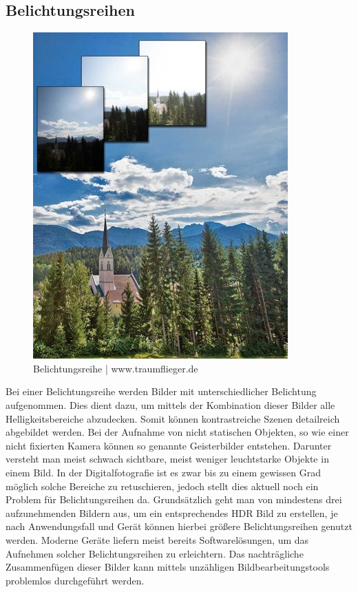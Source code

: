 \documentclass[11pt, a4paper, twocolumn]{article}
\begin{document}
	\subsection{Belichtungsreihen}
		\begin{figure}[H]
		\centering
		\includegraphics[scale=0.6]{img/belichtungsreihen.jpg}
		\caption{Belichtungsreihe | www.traumflieger.de}
	\end{figure}
	Bei einer Belichtungsreihe werden Bilder mit unterschiedlicher Belichtung aufgenommen. Dies dient dazu, um mittels der Kombination dieser Bilder alle Helligkeitsbereiche abzudecken. Somit können kontrastreiche Szenen detailreich abgebildet werden. Bei der Aufnahme von nicht statischen Objekten, so wie einer nicht fixierten Kamera können so genannte Geisterbilder entstehen. Darunter versteht man meist schwach sichtbare, meist weniger leuchtstarke Objekte in einem Bild. In der Digitalfotografie ist es zwar bis zu einem gewissen Grad möglich solche Bereiche zu retuschieren, jedoch stellt dies aktuell noch ein Problem für Belichtungsreihen da. Grundsätzlich geht man von mindestens drei aufzunehmenden Bildern aus, um ein entsprechendes HDR Bild zu erstellen, je nach Anwendungsfall und Gerät können hierbei größere Belichtungsreihen genutzt werden. Moderne Geräte liefern meist bereits Softwarelösungen, um das Aufnehmen solcher Belichtungsreihen zu erleichtern. Das nachträgliche Zusammenfügen dieser Bilder kann mittels unzähligen Bildbearbeitungstools problemlos durchgeführt werden.
\end{document}
